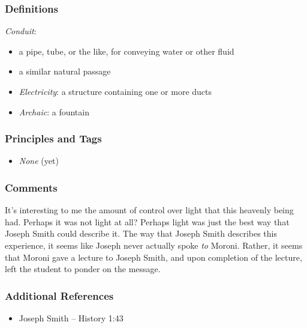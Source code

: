\documentclass[12pt]{report}
\begin{document}
\subsubsection{Definitions\label{js:DFN10}}
\emph{Conduit}: \begin{itemize}
\item a pipe, tube, or the like, for conveying water or other fluid
\item a similar natural passage
\item \emph{Electricity}: a structure containing one or more ducts
\item \emph{Archaic}: a fountain
\end{itemize}

\subsubsection{Principles and Tags\label{js:principles10}}
\begin{itemize}
\item \index{}\emph{None} (yet)
\end{itemize}

\subsubsection{Comments\label{js:comments10}}
It's interesting to me the amount of control over light that this heavenly being had.  Perhaps it was not light at all?  Perhaps light was just the best way that Joseph Smith could describe it.  The way that Joseph Smith describes this experience, it seems like Joseph never actually spoke \emph{to} Moroni.  Rather, it seems that Moroni gave a lecture to Joseph Smith, and upon completion of the lecture, left the student to ponder on the message.

\subsubsection{Additional References\label{js:reference10}}
\begin{itemize}
\item Joseph Smith -- History 1:43
\end{itemize}

\end{document}
